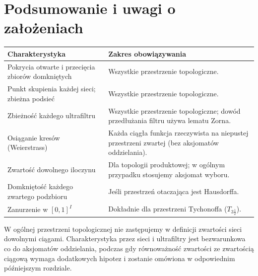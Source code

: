 \section{Podsumowanie i uwagi o założeniach}
\label{sec:topog-zwartosc-podsumowanie}

\begin{center}
\begin{tabular}{@{}p{}p{}@{}}
\hline
\textbf{Charakterystyka} & \textbf{Zakres obowiązywania} \\ \hline
Pokrycia otwarte i przecięcia zbiorów domkniętych &
Wszystkie przestrzenie topologiczne.\\
Punkt skupienia każdej sieci; zbieżna podsieć &
Wszystkie przestrzenie topologiczne.\\
Zbieżność każdego ultrafiltru &
Wszystkie przestrzenie topologiczne; dowód przedłużania
filtru używa lematu Zorna.\\
Osiąganie kresów (Weierstrass) &
Każda ciągła funkcja rzeczywista na niepustej
przestrzeni zwartej (bez aksjomatów oddzielania).\\
Zwartość dowolnego iloczynu &
Dla topologii produktowej; w ogólnym przypadku
stosujemy aksjomat wyboru.\\
Domkniętość każdego zwartego podzbioru &
Jeśli przestrzeń otaczająca jest Hausdorffa.\\
Zanurzenie w $[0,1]^I$ &
Dokładnie dla przestrzeni Tychonoffa ($T_{3\frac12}$).\\
\hline
\end{tabular}
\end{center}

\begin{uwaga}
\label{rem:topog-zwartosc-ciagowe}
W ogólnej przestrzeni topologicznej nie zastępujemy
w definicji zwartości sieci dowolnymi ciągami.
Charakterystyka przez sieci i ultrafiltry jest
bezwarunkowa co do aksjomatów oddzielania,
podczas gdy równoważność zwartości ze zwartością
ciągową wymaga dodatkowych hipotez i zostanie
omówiona w odpowiednim późniejszym rozdziale.
\end{uwaga}
